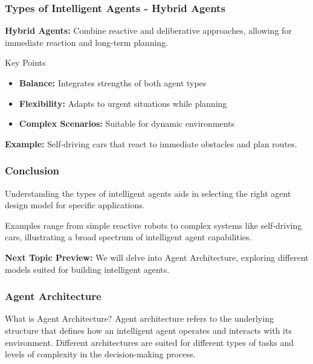 \documentclass[aspectratio=169]{beamer}
\begin{document}
\begin{frame}[fragile]
    \frametitle{Types of Intelligent Agents - Hybrid Agents}
    \textbf{Hybrid Agents:} 
    Combine reactive and deliberative approaches, allowing for immediate reaction and long-term planning.

    \begin{block}{Key Points}
        \begin{itemize}
            \item \textbf{Balance:} Integrates strengths of both agent types
            \item \textbf{Flexibility:} Adapts to urgent situations while planning
            \item \textbf{Complex Scenarios:} Suitable for dynamic environments
        \end{itemize}
    \end{block}

    \textbf{Example:} Self-driving cars that react to immediate obstacles and plan routes.
\end{frame}

\begin{frame}[fragile]
    \frametitle{Conclusion}
    Understanding the types of intelligent agents aids in selecting the right agent design model for specific applications. 

    Examples range from simple reactive robots to complex systems like self-driving cars, illustrating a broad spectrum of intelligent agent capabilities.

    \textbf{Next Topic Preview:} We will delve into Agent Architecture, exploring different models suited for building intelligent agents.
\end{frame}

\begin{frame}[fragile]
    \frametitle{Agent Architecture}
    \begin{block}{What is Agent Architecture?}
        Agent architecture refers to the underlying structure that defines how an intelligent agent operates and interacts with its environment. Different architectures are suited for different types of tasks and levels of complexity in the decision-making process.
    \end{block}
\end{frame}
\end{document}
